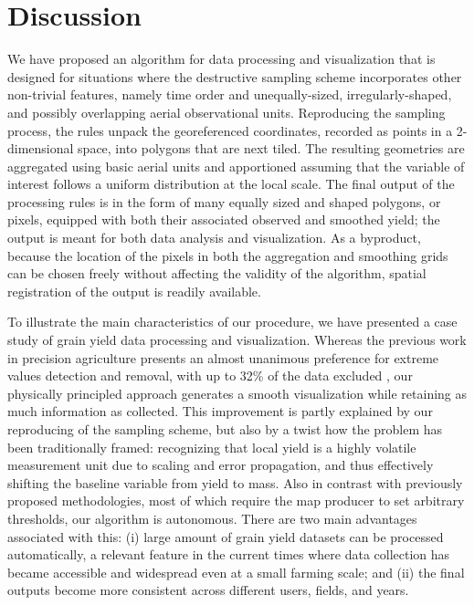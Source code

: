 \section {Discussion}

 We have proposed an algorithm
for data processing and visualization that is designed for situations
where the destructive sampling scheme incorporates other non-trivial
features, namely time order and unequally-sized, irregularly-shaped,
and possibly overlapping aerial observational units. Reproducing the
sampling process, the rules unpack the georeferenced coordinates,
recorded as points in a 2-dimensional space, into polygons that are
next tiled. The resulting geometries are aggregated using basic aerial
units and apportioned assuming that the variable of interest follows a
uniform distribution at the local scale. The final output of the
processing rules is in the form of many equally sized and shaped
polygons, or pixels, equipped with both their associated observed and
smoothed yield; the output is meant for both data analysis and
visualization. As a byproduct, because the location of the pixels in
both the aggregation and smoothing grids can be chosen freely without
affecting the validity of the algorithm, spatial registration of the
output is readily available.

 To illustrate the main
characteristics of our procedure, we have presented a case study of
grain yield data processing and visualization. Whereas the previous
work in precision agriculture presents an almost unanimous preference
for extreme values detection and removal, with up to 32\% of the data
excluded \cite{Lyle2013}, our physically principled approach generates
a smooth visualization while retaining as much information as
collected. This improvement is partly explained by our reproducing of
the sampling scheme, but also by a twist how the problem has been
traditionally framed: recognizing that local yield is a highly
volatile measurement unit due to scaling and error propagation, and
thus effectively shifting the baseline variable from yield to
mass. Also in contrast with previously proposed methodologies, most of
which require the map producer to set arbitrary thresholds, our
algorithm is autonomous. There are two main advantages associated with
this: (i) large amount of grain yield datasets can be processed
automatically, a relevant feature in the current times where data
collection has became accessible and widespread even at a small
farming scale; and (ii) the final outputs become more consistent
across different users, fields, and years.

